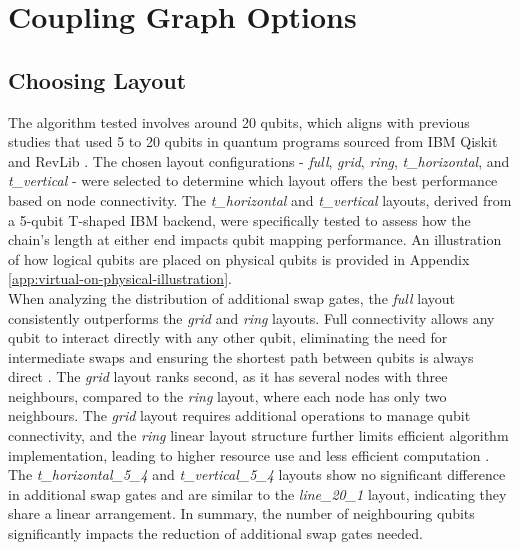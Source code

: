 \section{Coupling Graph Options} %
\subsection{Choosing Layout}
The algorithm tested involves around 20 qubits, which aligns with previous studies \cite{li_tackling_2019, zhu_dynamic_2020} that used 5 to 20 qubits in quantum programs sourced from IBM Qiskit \cite{siraichi_qubit_2018, zulehner_efficient_2018} and RevLib \cite{wille_revlib_2008}. The chosen layout configurations - \textit{full}, \textit{grid}, \textit{ring}, \textit{t\_horizontal}, and \textit{t\_vertical} - were selected to determine which layout offers the best performance based on node connectivity. The \textit{t\_horizontal} and \textit{t\_vertical} layouts, derived from a 5-qubit T-shaped IBM backend, were specifically tested to assess how the chain's length at either end impacts qubit mapping performance. An illustration of how logical qubits are placed on physical qubits is provided in Appendix \ref{app:virtual-on-physical-illustration}. \\
When analyzing the distribution of additional swap gates, the \textit{full} layout consistently outperforms the \textit{grid} and \textit{ring} layouts. Full connectivity allows any qubit to interact directly with any other qubit, eliminating the need for intermediate swaps and ensuring the shortest path between qubits is always direct \cite{hayes_graph_2000}. The \textit{grid} layout ranks second, as it has several nodes with three neighbours, compared to the \textit{ring} layout, where each node has only two neighbours. The \textit{grid} layout requires additional operations to manage qubit connectivity, and the \textit{ring} linear layout structure further limits efficient algorithm implementation, leading to higher resource use and less efficient computation \cite{peham_optimal_2023}. The \textit{t\_horizontal\_5\_4} and \textit{t\_vertical\_5\_4} layouts show no significant difference in additional swap gates and are similar to the \textit{line\_20\_1} layout, indicating they share a linear arrangement. In summary, the number of neighbouring qubits significantly impacts the reduction of additional swap gates needed. \\
